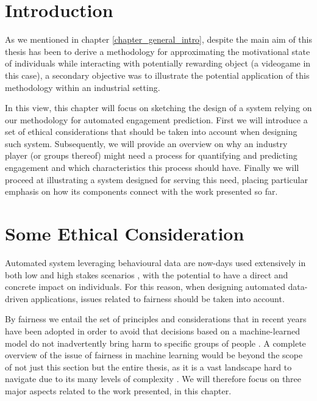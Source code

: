 \section{Introduction}
\label{industry_needs}
As we mentioned in chapter \ref{chapter_general_intro}, despite the main aim of this thesis has been to derive a methodology for approximating the motivational state of individuals while interacting with potentially rewarding object (a videogame in this case), a secondary objective was to illustrate the potential application of this methodology within an industrial setting.

In this view, this chapter will focus on sketching the design of a system relying on our methodology for automated engagement prediction. First we will introduce a set of ethical considerations that should be taken into account when designing such system. Subsequently, we will provide an overview on why an industry player (or groups thereof) might need a process for quantifying and predicting engagement and which characteristics this process should have. Finally we will proceed at illustrating a system designed for serving this need, placing particular emphasis on how its components connect with the work presented so far.

\section{Some Ethical Consideration}
\label{ehtical_considerations}
Automated system leveraging behavioural data are now-days used extensively in both low and high stakes scenarios \cite{mehrabi2021survey}, with the potential to have a direct and concrete impact on individuals. For this reason, when designing automated data-driven applications, issues related to fairness should be taken into account. 

By fairness we entail the set of principles and considerations that in recent years have been adopted in order to avoid that decisions based on a machine-learned model do not inadvertently bring harm to specific groups of people \cite{mehrabi2021survey}. A complete overview of the issue of fairness in machine learning would be beyond the scope of not just this section but the entire thesis, as it is a vast landscape \cite{mehrabi2021survey} hard to navigate due to its many levels of complexity \cite{corbett2018measure}.  We will therefore focus on three major aspects related to the work presented, in this chapter. 

